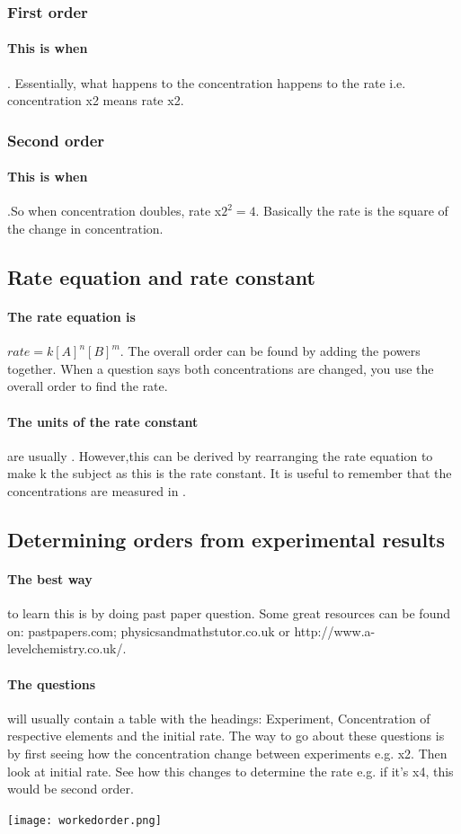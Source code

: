 \subsubsection{First order}
\paragraph{This is when}. Essentially, what happens to the concentration happens to the rate i.e. concentration x2 means rate x2.
\subsubsection{Second order}
\paragraph{This is when}.So when concentration doubles, rate x$2^2=4$. Basically the rate is the square of the change in concentration.
\subsection{Rate equation and rate constant}
\paragraph{The rate equation is}$rate=k[A]^n[B]^m$. The overall order can be found by adding the powers together. When a question says both concentrations are changed, you use the overall order to find the rate.
\paragraph{The units of the rate constant}are usually . However,this can be derived by rearranging the rate equation to make k the subject as this is the rate constant. It is useful to remember that the concentrations are measured in .
\subsection{Determining orders from experimental results}
\paragraph{The best way}to learn this is by doing past paper question. Some great resources can be found on: pastpapers.com; physicsandmathstutor.co.uk or http://www.a-levelchemistry.co.uk/.
\paragraph{The questions}will usually contain a table with the headings: Experiment, Concentration of respective elements and the initial rate. The way to go about these questions is by first seeing how the concentration change between experiments e.g. x2. Then look at initial rate. See how this changes to determine the rate e.g. if it's x4, this would be second order.
\begin{center}
\texttt{[image: workedorder.png]}
\end{center}
\newpage
